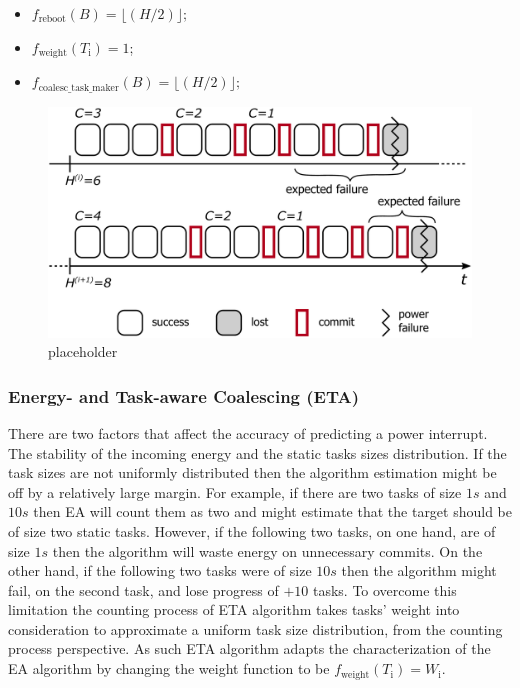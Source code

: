 \begin{itemize}
\item $f_\text{reboot}(B) = \lfloor(H / 2)\rfloor;$
\item $f_\text{weight}(T_\text{i}) =  1$; 
\item $f_\text{coalesc\_task\_maker}(B) = \lfloor(H / 2)\rfloor;$ 
\end{itemize}

\begin{figure}
	\centering
	\includegraphics[width=0.5\columnwidth]{figures/energy-aware-coal.pdf}
	\caption{placeholder}
	\label{fig:energyAware}
\end{figure}


\subsubsection{Energy- and Task-aware Coalescing (ETA)}
\label{subsec:energyTaskAware}

There are two factors that affect the accuracy of predicting a power interrupt. The stability of the incoming energy and the static tasks sizes distribution. If the task sizes are not uniformly distributed then the algorithm estimation might be off by a relatively large margin. For example, if there are two tasks of size $1s$ and $10s$ then EA will count them as two and might estimate that the target should be of size two static tasks. However, if the following two tasks, on one hand, are of size $1s$ then the algorithm will waste energy on unnecessary commits. On the other hand, if the following two tasks were of size $10s$ then the algorithm might fail, on the second task, and lose progress of $+10$ tasks. To overcome this limitation the counting process of ETA algorithm takes tasks' weight into consideration to approximate a uniform task size distribution, from the counting process perspective. As such ETA algorithm adapts the characterization of the EA algorithm by changing the weight function to be $f_\text{weight}(T_\text{i}) = W_\text{i}$.